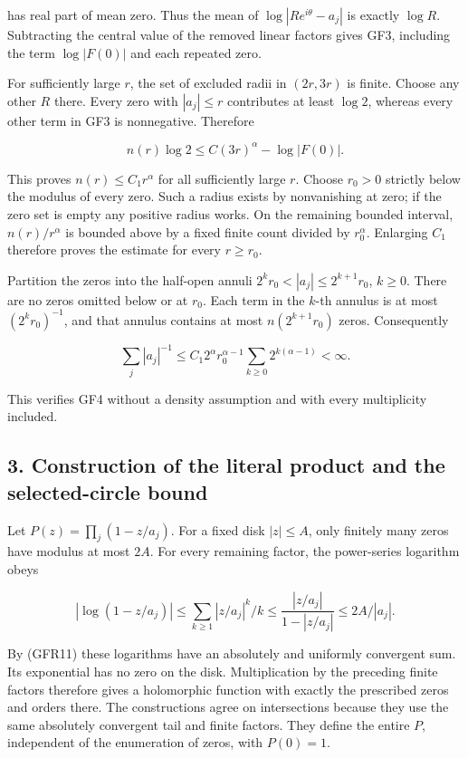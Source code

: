 has real part of mean zero. Thus the mean of \(\log|Re^{i\theta}-a_j|\) is exactly \(\log R\). Subtracting the central value of the removed linear factors gives GF3, including the term \(\log|F(0)|\) and each repeated zero.

For sufficiently large \(r\), the set of excluded radii in \((2r,3r)\) is finite. Choose any other \(R\) there. Every zero with \(|a_j|\le r\) contributes at least \(\log2\), whereas every other term in GF3 is nonnegative. Therefore

\[
n(r)\log2\le C(3r)^\alpha-\log|F(0)|.
\tag{GFR10}
\]

This proves \(n(r)\le C_1r^\alpha\) for all sufficiently large \(r\). Choose \(r_0>0\) strictly below the modulus of every zero. Such a radius exists by nonvanishing at zero; if the zero set is empty any positive radius works. On the remaining bounded interval, \(n(r)/r^\alpha\) is bounded above by a fixed finite count divided by \(r_0^\alpha\). Enlarging \(C_1\) therefore proves the estimate for every \(r\ge r_0\).

Partition the zeros into the half-open annuli \(2^kr_0<|a_j|\le2^{k+1}r_0\), \(k\ge0\). There are no zeros omitted below or at \(r_0\). Each term in the \(k\)-th annulus is at most \((2^kr_0)^{-1}\), and that annulus contains at most \(n(2^{k+1}r_0)\) zeros. Consequently

\[
\sum_j|a_j|^{-1}
\le C_1 2^\alpha r_0^{\alpha-1}
\sum_{k\ge0}2^{k(\alpha-1)}<\infty.
\tag{GFR11}
\]

This verifies GF4 without a density assumption and with every multiplicity included.

\subsection{3. Construction of the literal product and the selected-circle bound}\label{C47stage:GFR:construction-of-the-literal-product-and-the-selected-circle-bound}

Let \(P(z)=\prod_j(1-z/a_j)\). For a fixed disk \(|z|\le A\), only finitely many zeros have modulus at most \(2A\). For every remaining factor, the power-series logarithm obeys

\[
|\log(1-z/a_j)|
\le\sum_{k\ge1}|z/a_j|^k/k
\le\frac{|z/a_j|}{1-|z/a_j|}\le2A/|a_j|.
\tag{GFR12}
\]

By (GFR11) these logarithms have an absolutely and uniformly convergent sum. Its exponential has no zero on the disk. Multiplication by the preceding finite factors therefore gives a holomorphic function with exactly the prescribed zeros and orders there. The constructions agree on intersections because they use the same absolutely convergent tail and finite factors. They define the entire \(P\), independent of the enumeration of zeros, with \(P(0)=1\).

